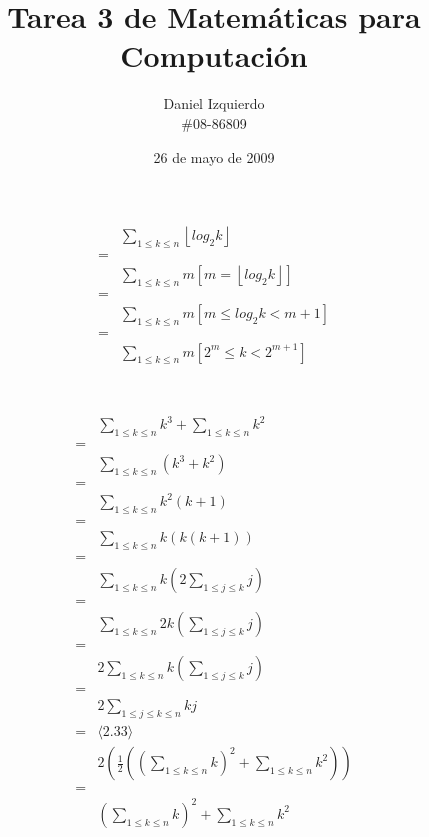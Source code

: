 \documentclass{article}
\newcommand{\piso}[1]{\left \lfloor #1 \right \rfloor}
\begin{document}

\title{Tarea 3 de Matemáticas para Computación}
\author{Daniel Izquierdo \\ \#08-86809}
\date{26 de mayo de 2009}

\maketitle

\section{}

\begin{align*}
 & \sum_{1 \leq k \leq n} \piso{log_2k} \\
 = & \\
 & \sum_{1 \leq k \leq n} m[m = \piso{log_2k}] \\
 = & \\
 & \sum_{1 \leq k \leq n} m[m \leq log_2k < m+1] \\
 = & \\
 & \sum_{1 \leq k \leq n} m[2^m \leq k < 2^{m+1}] \\
\end{align*}

\newpage

\section{}

\begin{align*}
 & \sum_{1 \leq k \leq n} k^3 + \sum_{1 \leq k \leq n} k^2 \\
 = & \\
 & \sum_{1 \leq k \leq n}(k^3+k^2) \\
 = & \\
 & \sum_{1 \leq k \leq n}k^2(k+1) \\
 = & \\
 & \sum_{1 \leq k \leq n}k(k(k+1)) \\
 = & \\
 & \sum_{1 \leq k \leq n}k\left(2 \sum_{1 \leq j \leq k} j\right) \\
 = & \\
 & \sum_{1 \leq k \leq n}2k\left(\sum_{1 \leq j \leq k} j\right) \\
 = & \\
 & 2\sum_{1 \leq k \leq n}k\left(\sum_{1 \leq j \leq k} j\right) \\
 = & \\
 & 2\sum_{1 \leq j \leq k \leq n}kj \\
 = & \langle \text{2.33} \rangle \\
 & 2\left(\frac{1}{2}\left(\left(\sum_{1 \leq k \leq n} k \right)^2 + \sum_{1 \leq k \leq n}k^2 \right)\right) \\
 = & \\
 & \left(\sum_{1 \leq k \leq n} k \right)^2 + \sum_{1 \leq k \leq n}k^2 \\
\end{align*}
\end{document}

